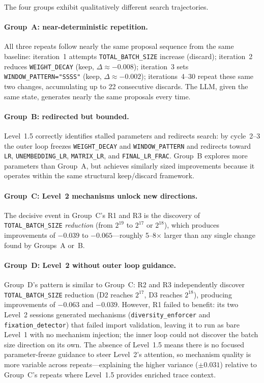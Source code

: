 The four groups exhibit qualitatively different search trajectories.

\paragraph{Group~A: near-deterministic repetition.}
All three repeats follow nearly the same proposal sequence from the same
baseline:
iteration~1 attempts \texttt{TOTAL\_BATCH\_SIZE} increase (discard);
iteration~2 reduces \texttt{WEIGHT\_DECAY} (keep, $\Delta \approx -0.008$);
iteration~3 sets \texttt{WINDOW\_PATTERN="SSSS"} (keep, $\Delta \approx -0.002$);
iterations~4--30 repeat these same two changes, accumulating up to 22
consecutive discards.
The LLM, given the same state, generates nearly the same proposals every time.

\paragraph{Group~B: redirected but bounded.}
Level~1.5 correctly identifies stalled parameters and redirects search:
by cycle~2--3 the outer loop freezes \texttt{WEIGHT\_DECAY} and
\texttt{WINDOW\_PATTERN} and redirects toward \texttt{LR},
\texttt{UNEMBEDDING\_LR}, \texttt{MATRIX\_LR}, and \texttt{FINAL\_LR\_FRAC}.
Group~B explores more parameters than Group~A, but achieves similarly sized
improvements because it operates within the same structural keep/discard
framework.

\paragraph{Group~C: Level~2 mechanisms unlock new directions.}
The decisive event in Group~C's R1 and R3 is the discovery of
\texttt{TOTAL\_BATCH\_SIZE} \emph{reduction} (from $2^{19}$ to $2^{17}$ or
$2^{18}$), which produces improvements of $-0.039$ to $-0.065$---roughly
5--8$\times$ larger than any single change found by Groups~A or~B.

\paragraph{Group~D: Level~2 without outer loop guidance.}
Group~D's pattern is similar to Group~C: R2 and R3 independently discover
\texttt{TOTAL\_BATCH\_SIZE} reduction (D2 reaches $2^{17}$, D3 reaches $2^{18}$),
producing improvements of $-0.063$ and $-0.039$.
However, R1 failed to benefit: its two Level~2 sessions generated mechanisms
(\texttt{diversity\_enforcer} and \texttt{fixation\_detector}) that failed import
validation, leaving it to run as bare Level~1 with no mechanism injection; the
inner loop could not discover the batch size direction on its own.
The absence of Level~1.5 means there is no focused parameter-freeze guidance
to steer Level~2's attention, so mechanism quality is more variable across
repeats---explaining the higher variance ($\pm 0.031$) relative to Group~C's
repeats where Level~1.5 provides enriched trace context.

